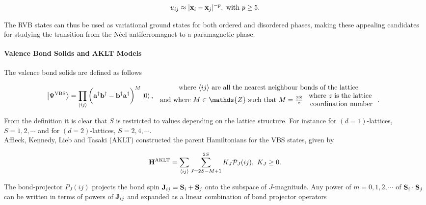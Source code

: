 \documentclass{homework}
\begin{document}
$$
    u_{ij} \approx |{\bf x}_i - {\bf x}_j|^{-p}, \textnormal{ with } p \geq 5.
$$

The RVB states can thus be used as variational ground states for both ordered and disordered phases, making these appealing candidates for studying the transition from the Néel antiferromagnet to a paramagnetic phase. \\

\paragraph{Valence Bond Solids and AKLT Models}

The valence bond solids are defined as follows 

\begin{equation}
\ket{\Psi^{\textnormal{VBS}}} = \prod_{\langle ij \rangle} \bigg({\bf a}^\dagger {\bf b}^\dagger - {\bf b}^\dagger {\bf a}^\dagger\bigg)^M \ket{0}, \begin{array}{c}
     \textnormal{where $\langle ij \rangle$ are all the nearest neighbour bonds of the lattice} \\
     \textnormal{ and where $M \in \mathds{Z}$ such that } M  =\frac{2S}{z} \begin{array}{cc}
          \textnormal{ where $z$ is the lattice }  \\
          \textnormal{ coordination number}
     \end{array}.
     \label{valence_bond_solids}
\end{array}
\end{equation}

From the definition it is clear that $S$ is restricted to values depending on the lattice structure. For instance for $(d=1)$-lattices, $S = 1, 2, \cdots$ and for $(d=2)$-lattices, $S = 2,4, \cdots$. \\

Affleck, Kennedy, Lieb and Tasaki (AKLT) constructed the parent Hamiltonians for the VBS states, given by 

\begin{equation}
    {\bf H}^{\textnormal{AKLT}} = \sum_{\langle ij \rangle} \sum_{J = 2S-M+1}^{2S} K_J \mathcal{P}_{J}(ij), \textnormal{ } K_J \geq 0.
\end{equation}

The bond-projector $P_J(ij)$ projects the bond spin ${\bf J}_{ij} = {\bf S}_i + {\bf S}_j$ onto the subspace of $J$-magnitude. Any power of $m = 0, 1, 2, \cdots$ of ${\bf S}_i \cdot {\bf S}_j$ can be written in terms of powers of ${\bf J}_{ij}$ and expanded as a linear combination of bond projector operators 
\end{document}
